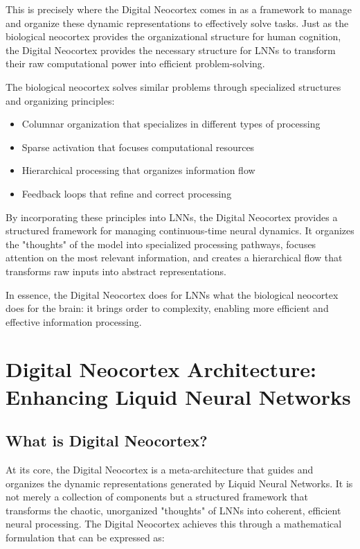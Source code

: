 \documentclass{article}
\begin{document}
This is precisely where the Digital Neocortex comes in as a framework to manage and organize these dynamic representations to effectively solve tasks. Just as the biological neocortex provides the organizational structure for human cognition, the Digital Neocortex provides the necessary structure for LNNs to transform their raw computational power into efficient problem-solving.

The biological neocortex solves similar problems through specialized structures and organizing principles:

\begin{itemize}
    \item Columnar organization that specializes in different types of processing
    \item Sparse activation that focuses computational resources
    \item Hierarchical processing that organizes information flow
    \item Feedback loops that refine and correct processing
\end{itemize}

By incorporating these principles into LNNs, the Digital Neocortex provides a structured framework for managing continuous-time neural dynamics. It organizes the "thoughts" of the model into specialized processing pathways, focuses attention on the most relevant information, and creates a hierarchical flow that transforms raw inputs into abstract representations.

In essence, the Digital Neocortex does for LNNs what the biological neocortex does for the brain: it brings order to complexity, enabling more efficient and effective information processing.

\section{Digital Neocortex Architecture: Enhancing Liquid Neural Networks}
\label{sec:architecture}

\subsection{What is Digital Neocortex?}
At its core, the Digital Neocortex is a meta-architecture that guides and organizes the dynamic representations generated by Liquid Neural Networks. It is not merely a collection of components but a structured framework that transforms the chaotic, unorganized "thoughts" of LNNs into coherent, efficient neural processing. The Digital Neocortex achieves this through a mathematical formulation that can be expressed as:
\end{document}
